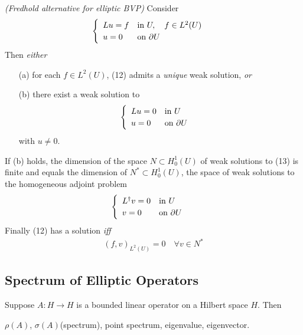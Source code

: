 \documentclass[10pt,a4paper]{report}
\begin{document}
\thm \emph{(Fredhold alternative for elliptic BVP)} Consider
\begin{align}
\begin{cases}
\begin{array}{ll}
Lu = f & \text{in } U, \quad f\in L^2(U) \\
u = 0 & \text{on } \partial U
\end{array}
\end{cases} \label{14}
\end{align}
Then \emph{either} \begin{itemize}
\item[(a)] for each $f\in L^2(U)$, (12) admits a \emph{unique} weak solution, \emph{or}
\item[(b)] there exist a weak solution to
\begin{align}
\begin{cases}
\begin{array}{ll}
Lu = 0 & \text{in } U \\
u = 0 & \text{on } \partial U
\end{array}
\end{cases} \label{15}
\end{align}
with $u \neq 0$.
\end{itemize}
If (b) holds, the dimension of the space $N \subset H_0^1(U)$ of weak solutions to (13) is finite and equals the dimension of $N^* \subset H_0^1(U)$, the space of weak solutions to the homogeneous adjoint problem
\begin{align*}
\begin{cases}
\begin{array}{ll}
L^{\dagger}v = 0 & \text{in } U \\
v = 0 & \text{on } \partial U
\end{array}
\end{cases}
\end{align*}
\quad Finally (12) has a solution \emph{iff}
\begin{align*}
(f,v)_{L^2(U)} = 0 \quad \forall v\in N^*
\end{align*}

\subsection*{Spectrum of Elliptic Operators}

Suppose $A: H\rightarrow H$ is a bounded linear operator on a Hilbert space $H$. Then

 $\rho(A)$, $\sigma(A)$(spectrum), point spectrum, eigenvalue, eigenvector.
\s
\end{document}
